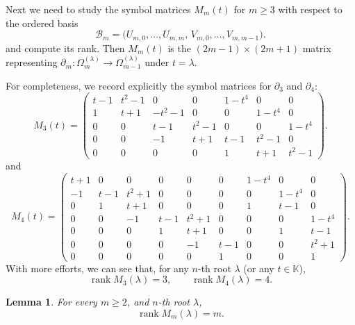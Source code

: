 \documentclass[11pt]{amsart}
\newcommand{\K}{\mathbb K}
\newcommand{\rank}{\operatorname{rank}}
\theoremstyle{plain}
\newtheorem{lemma}[theorem]{Lemma}
\theoremstyle{definition}
\numberwithin{equation}{section}
\begin{document}
Next we need to study the symbol matrices $M_m(t)$ for $m\ge 3$ with respect to the ordered basis
\[
\mathcal{B}_m=\bigl(U_{m,0},\dots,U_{m,m},\, V_{m,0},\dots,V_{m,m-1}\bigr).
\]
and compute its rank. Then $M_m(t)$ is the $(2m-1)\times(2m+1)$ matrix representing
$\partial_m:\Omega_m^{(\lambda)}\to\Omega_{m-1}^{(\lambda)}$ under $t=\lambda$.

For completeness, we record explicitly the symbol matrices for $\partial_3$ and $\partial_4$:
\[
M_3(t)=
\begin{pmatrix}
t-1 & t^2-1 & 0 & 0 & 1-t^4 & 0 & 0\\
1 & t+1 & -t^2-1 & 0 & 0 & 1-t^4 & 0\\
0 & 0 & t-1 & t^2-1 & 0 & 0 & 1-t^4\\
0 & 0 & -1 & t+1 & t-1 & t^2-1 & 0\\
0 & 0 & 0 & 0 & 1 & t+1 & t^2-1
\end{pmatrix}.
\]
and
\[
M_4(t)=
\begin{pmatrix}
t+1& 0& 0& 0& 0& 0& 1-t^4& 0& 0\\
-1& t-1& t^2+1& 0& 0& 0& 0& 1-t^4& 0\\
0& 1& t+1& 0& 0& 0& 1& t-1& 0\\
0& 0& -1& t-1& t^2+1& 0& 0& 0& 1-t^4\\
0& 0& 0& 1& t+1& 0& 0& 1& t-1\\
0& 0& 0& 0& -1& t-1& 0& 0& t^2+1\\
0& 0& 0& 0& 0& 1& 0& 0& 1
\end{pmatrix}.
\]
With more efforts, we can see that, for any $n$-th root $\lambda$ (or any $t\in\K$),
\[\rank M_3(\lambda)=3,\qquad \rank M_4(\lambda)=4.\]



\begin{lemma}
For every $m\ge2$, and $n$-th root $\lambda$,
\[\rank M_m(\lambda)=m.\]
\end{lemma}
\end{document}
